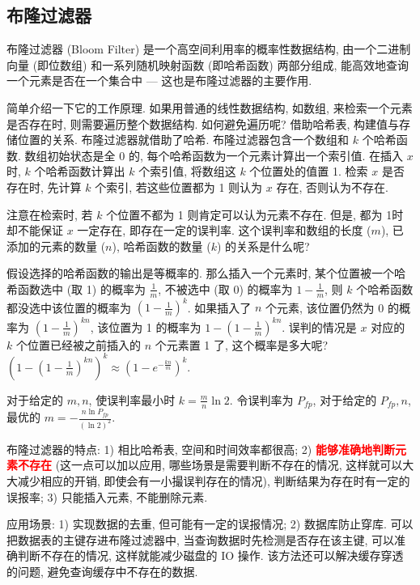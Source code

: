 \subsection{布隆过滤器}
布隆过滤器 (Bloom Filter) 是一个高空间利用率的概率性数据结构, 由一个二进制向量 (即位数组) 和一系列随机映射函数 (即哈希函数) 两部分组成, 能高效地查询一个元素是否在一个集合中 --- 这也是布隆过滤器的主要作用. 

简单介绍一下它的工作原理. 如果用普通的线性数据结构, 如数组, 来检索一个元素是否存在时, 则需要遍历整个数据结构. 如何避免遍历呢? 借助哈希表, 构建值与存储位置的关系. 布隆过滤器就借助了哈希. 布隆过滤器包含一个数组和 $k$ 个哈希函数. 数组初始状态是全 0 的, 每个哈希函数为一个元素计算出一个索引值. 在插入 $x$ 时, $k$ 个哈希函数计算出 $k$ 个索引值, 将数组这 $k$ 个位置处的值置 1. 检索 $x$ 是否存在时, 先计算 $k$ 个索引, 若这些位置都为 1 则认为 $x$ 存在, 否则认为不存在.

注意在检索时, 若 $k$ 个位置不都为 1 则肯定可以认为元素不存在. 但是, 都为 1时却不能保证 $x$ 一定存在, 即存在一定的误判率. 这个误判率和数组的长度 ($m$), 已添加的元素的数量 ($n$), 哈希函数的数量 ($k$) 的关系是什么呢? 

假设选择的哈希函数的输出是等概率的. 那么插入一个元素时, 某个位置被一个哈希函数选中 (取 1) 的概率为 $\frac{1}{m}$, 不被选中 (取 0) 的概率为 $1 - \frac{1}{m}$, 则 $k$ 个哈希函数都没选中该位置的概率为 $(1 - \frac{1}{m})^k$. 如果插入了 $n$ 个元素, 该位置仍然为 0 的概率为 $(1 - \frac{1}{m})^{kn}$, 该位置为 1 的概率为 $1 - (1 - \frac{1}{m})^{kn}$. 误判的情况是 $x$ 对应的 $k$ 个位置已经被之前插入的 $n$ 个元素置 1 了, 这个概率是多大呢? \textbf{$(1 - (1 - \frac{1}{m})^{kn})^k \approx (1 - e^{- \frac{k n}{m}})^k$}.

对于给定的 $m, n$, 使误判率最小时 $k = \frac{m}{n} \ln 2$. 令误判率为 $P_{fp}$, 对于给定的 $P_{fp}, n$, 最优的 $m = - \frac{n \ln P_{fp}}{(\ln 2)^2}$. 

布隆过滤器的特点: 1) 相比哈希表, 空间和时间效率都很高; 2) \textcolor{red}{\textbf{能够准确地判断元素不存在}} (这一点可以加以应用, 哪些场景是需要判断不存在的情况, 这样就可以大大减少相应的开销, 即使会有一小撮误判存在的情况), 判断结果为存在时有一定的误报率; 3) 只能插入元素, 不能删除元素.

应用场景: 1) 实现数据的去重, 但可能有一定的误报情况; 2) 数据库防止穿库. 可以把数据表的主键存进布隆过滤器中, 当查询数据时先检测是否存在该主键, 可以准确判断不存在的情况, 这样就能减少磁盘的 IO 操作. 该方法还可以解决缓存穿透的问题, 避免查询缓存中不存在的数据. 